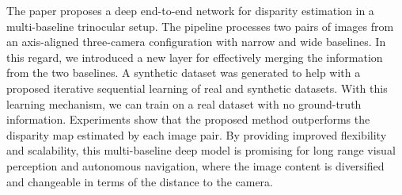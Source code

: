 \documentclass[10pt,twocolumn,letterpaper]{article}
\begin{document}
\label{Conclusion}
The paper proposes a deep end-to-end network for disparity estimation in a multi-baseline trinocular setup. The pipeline processes two pairs of images from an axis-aligned three-camera configuration with narrow and wide baselines. In this regard, we introduced a new layer for effectively merging the information from the two baselines. A synthetic dataset was generated to help with a proposed iterative sequential learning of real and synthetic datasets. With this learning mechanism, we can train on a real dataset with no ground-truth information. Experiments show that the proposed method outperforms the disparity map estimated by each image pair. By providing improved flexibility and scalability, this multi-baseline deep model is promising for long range visual perception and autonomous navigation, where the image content is diversified and changeable in terms of the distance to the camera.
{\small
	
	
}
\end{document}

